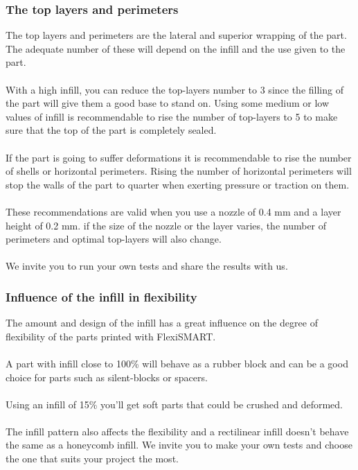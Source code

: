 \documentclass[11pt,a4paper]{article}
\begin{document}
		\subsubsection{The top layers and perimeters}
The top layers and perimeters are the lateral and superior wrapping of the part. The adequate number of these will depend on the infill and the use given to the part.
\\\\
With a high infill, you can reduce the top-layers number to 3 since the filling of the part will give them a good base to stand on. Using some medium or low values of infill is recommendable to rise the number of top-layers to 5 to make sure that the top of the part is completely sealed.
\\\\
If the part is going to suffer deformations it is recommendable to rise the number of shells or horizontal perimeters. Rising the number of horizontal perimeters will stop the walls of the part to quarter when exerting pressure or traction on them.
\\\\
These recommendations are valid when you use a nozzle of 0.4 mm and a layer height of 0.2 mm. if the size of the nozzle or the layer varies, the number of perimeters and optimal top-layers will also change.
\\\\
We invite you to run your own tests and share the results with us.
		\subsubsection{Influence of the infill in flexibility}
The amount and design of the infill has a great influence on the degree of flexibility of the parts printed with FlexiSMART.
\\\\
A part with infill close to 100\% will behave as a rubber block and can be a good choice for parts such as silent-blocks or spacers.
\\\\
Using an infill of 15\% you’ll get soft parts that could be crushed and deformed.
\\\\
The infill pattern also affects the flexibility and a rectilinear infill doesn’t behave the same as a honeycomb infill. We invite you to make your own tests and choose the one that suits your project the most.
\end{document}
